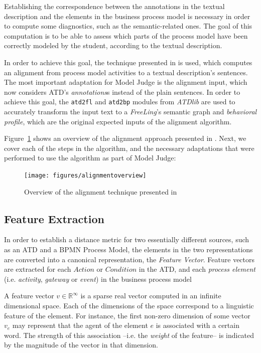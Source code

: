 Establishing the correspondence between the annotations in the textual
description and the elements in the business process model is necessary in order
to compute some diagnostics, such as the semantic-related ones. The goal of this
computation is to be able to assess which parts of the process model have been
correctly modeled by the student, according to the textual description.

In order to achieve this goal, the technique presented in
\cite{10.1007/978-3-319-59536-8_26} is used, which computes an alignment from
process model activities to a textual description's sentences. The most
important adaptation for Model Judge is the alignment input, which now considers
ATD's \emph{annotations}s instead of the plain sentences. In order to
achieve this goal, the \texttt{atd2fl} and \texttt{atd2bp} modules from
\emph{ATDlib} are used to accurately transform the input text to a
\emph{FreeLing}'s semantic graph and \emph{behavioral profile}, which are the
original expected inputs of the alignment algorithm.

Figure~\ref{fig:alignment_overview} shows an overview of the alignment approach
presented in \cite{10.1007/978-3-319-59536-8_26}. Next, we cover each of the
steps in the algorithm, and the necessary adaptations that were performed to
use the algorithm as part of Model Judge:

\begin{figure}[htb]
  \centering
  \texttt{[image: figures/alignmentoverview]}
  \caption{Overview of the alignment technique presented in \cite{10.1007/978-3-319-59536-8_26}}
  \label{fig:alignment_overview}
\end{figure}
\subsection{Feature Extraction}

In order to establish a distance metric for two essentially different sources,
such as an ATD and a BPMN Process Model, the elements in the two representations
are converted into a canonical representation, the \emph{Feature Vector}.
Feature vectors are extracted for each $Action$ or $Condition$ in the ATD, and
each \emph{process element} (i.e. \emph{activity}, \emph{gateway} or
\emph{event}) in the business process model

A feature vector $v \in \mathbb{R}^\infty$ is a sparse real vector computed in
an infinite dimensional space. Each of the dimensions of the space correspond to
a linguistic feature of the element. For instance, the first non-zero dimension
of some vector $v_e$ may represent that the agent of the element $e$ is
associated with a certain word. The strength of this association --i.e. the
\emph{weight} of the feature-- is indicated by the magnitude of the vector in
that dimension.

